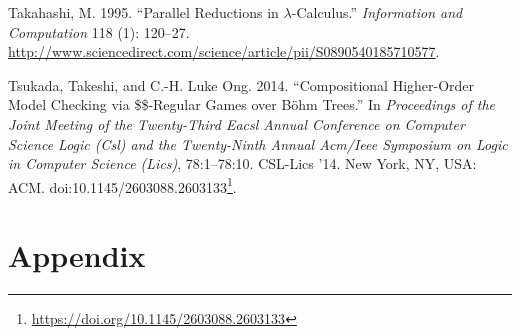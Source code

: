 \documentclass[a4paper, 12pt, twoside]{style/ociamthesis}
\theoremstyle{plain}
\theoremstyle{definition}
\theoremstyle{remark}
\renewcommand{\href}[2]{#2\footnote{\url{#1}}}
\begin{document}
\hypertarget{ref-takahashi95}{}
Takahashi, M. 1995. ``Parallel Reductions in \(\lambda\)-Calculus.''
\emph{Information and Computation} 118 (1): 120--27.
\url{http://www.sciencedirect.com/science/article/pii/S0890540185710577}.

\hypertarget{ref-tsukada14}{}
Tsukada, Takeshi, and C.-H. Luke Ong. 2014. ``Compositional Higher-Order
Model Checking via \$\$-Regular Games over Böhm Trees.'' In
\emph{Proceedings of the Joint Meeting of the Twenty-Third Eacsl Annual
Conference on Computer Science Logic (Csl) and the Twenty-Ninth Annual
Acm/Ieee Symposium on Logic in Computer Science (Lics)}, 78:1--78:10.
CSL-Lics '14. New York, NY, USA: ACM.
doi:\href{https://doi.org/10.1145/2603088.2603133}{10.1145/2603088.2603133}.




\setcounter{secnumdepth}{0}
\chapter*{Appendix}\label{appendix}

\newpage

\newpage
\end{document}
